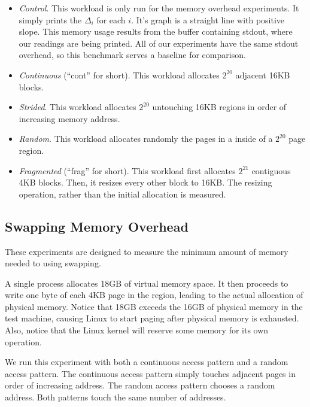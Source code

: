\documentclass[twocolumn,11pt]{article}
\begin{document}
\begin{itemize} \item \textit{Control}. This workload is only run for the memory
overhead experiments. It simply prints the $\Delta_i$ for each $i$. It's graph
is a straight line with positive slope. This memory usage results from the
buffer containing stdout, where our readings are being printed. All of our
experiments have the same stdout overhead, so this benchmark serves a baseline
for comparison.

\item \textit{Continuous} (``cont'' for short). This workload allocates $2^{20}$
adjacent 16KB blocks.

\item \textit{Strided}. This workload allocates $2^{20}$ untouching 16KB regions
in order of increasing memory address.

\item \textit{Random}. This workload allocates randomly the pages in a
inside of a $2^{20}$ page region.

\item \textit{Fragmented} (``frag'' for short). This workload first allocates
    $2^{21}$ contiguous 4KB blocks. Then, it resizes every other block to 16KB.
        The resizing operation, rather than the initial allocation is measured.
\end{itemize}

\subsection{Swapping Memory Overhead}
\label{swapping_memory_overhead}

These experiments are designed to measure the minimum amount of memory needed
to using swapping.

A single process allocates 18GB of virtual memory space. It then proceeds to
write one byte of each 4KB page in the region, leading to the actual allocation
of physical memory. Notice that 18GB exceeds the 16GB of physical memory in the
test machine, causing Linux to start paging after physical memory is exhausted.
Also, notice that the Linux kernel will reserve some memory for its own
operation.

We run this experiment with both a continuous access pattern and a random access
pattern. The continuous access pattern simply touches adjacent pages in order of
increasing address. The random access pattern chooses a random address. Both
patterns touch the same number of addresses.
\end{document}
